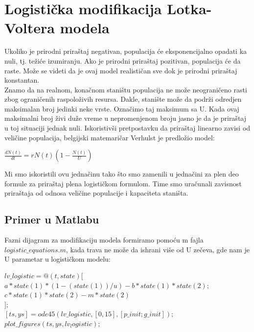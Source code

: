 \documentclass[a4paper]{article}
\begin{document}
\section{Logistička modifikacija Lotka-Voltera modela}
\label{sec:log_mod}
Ukoliko je prirodni priraštaj negativan, populacija će eksponencijalno opadati ka nuli,
tj. težiće izumiranju. Ako je prirodni priraštaj pozitivan, populacija će da raste.
Može se videti da je ovaj model realističan sve dok je prirodni priraštaj konstantan.\\
Znamo da na realnom, konačnom staništu populacija ne može neograničeno rasti zbog
ograničenih raspoloživih resursa. Dakle, stanište može da podrži odredjen maksimalan broj
jedinki neke vrste. Označimo taj maksimum sa U. Kada ovaj maksimalni broj živi duže vreme u
nepromenjenom broju jasno je da je priraštaj u toj situaciji jednak nuli. Iskoristivši pretpostavku
da priraštaj linearno zavisi od veličine populacija, belgijski matemaričar Verhulst je predložio model:
	\begin{center}
		$\frac{dN(t)}{dt}=rN (t) (1 - \frac{N (t)}{U})$
	\end{center}
Mi smo iskoristili ovu jednačinu tako što smo zamenili u jednačini za plen deo
formule za priraštaj plena logističkom formulom. Time smo uračunali zavisnost
priraštaja od odnosa veličine populacije i kapaciteta staništa.\\

\subsection{Primer u Matlabu}
\label{sub:log_mod_matlab}

Fazni dijagram za modifikaciju modela formiramo pomoću m fajla $ logistic\_equations.m $, kada
trava ne može da ishrani više od U zečeva, gde nam je U parametar u logističkom modelu:

\begin{flushleft}
	$lv\_logistic = @ (t, state) [ $\\
	$a * state(1) * ( 1 - (state(1))/u) - b * state(1) * state(2);$\\
	$c * state(1) * state(2) - m * state(2)$\\
	$];$\\
	$[ts, ys] = ode45(lv\_logistic, [0, 15], [p\_init;g\_init]);$\\
	$plot\_figures(ts, ys, lv_logistic); $
\end{flushleft}
 
\end{document}
